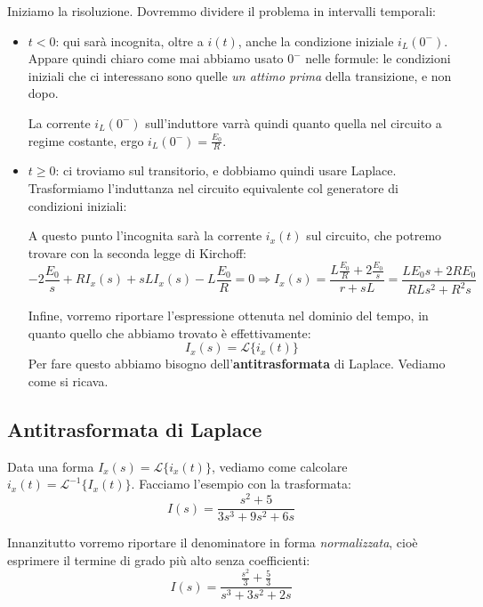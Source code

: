 \documentclass[a4paper,11pt]{article}
\begin{document}
Iniziamo la risoluzione.
Dovremmo dividere il problema in intervalli temporali:
\begin{itemize}
	\item $t < 0$: qui sarà incognita, oltre a $i(t)$, anche la condizione iniziale $i_L(0^-)$.
		Appare quindi chiaro come mai abbiamo usato $0^-$ nelle formule: le condizioni iniziali che ci interessano sono quelle \textit{un attimo prima} della transizione, e non dopo.

		La corrente $i_L(0^-)$ sull'induttore varrà quindi quanto quella nel circuito a regime costante, ergo $i_L(0^-) = \frac{E_0}{R}$.
	\item $t \geq 0$: ci troviamo sul transitorio, e dobbiamo quindi usare Laplace.
		Trasformiamo l'induttanza nel circuito equivalente col generatore di condizioni iniziali:

\begin{center}
\end{center}

A questo punto l'incognita sarà la corrente $i_x(t)$ sul circuito, che potremo trovare con la seconda legge di Kirchoff:
$$
-2 \frac{E_0}{s} + R I_x(s) + s L I_x(s) - L \frac{E_0}{R} = 0 \Rightarrow I_x(s) =  \frac{L \frac{E_0}{R} + 2 \frac{E_0}{s}}{r + s L} = \frac{L E_0 s + 2 R E_0}{R L s^2 + R^2 s}
$$

Infine, vorremo riportare l'espressione ottenuta nel dominio del tempo, in quanto quello che abbiamo trovato è effettivamente:
$$I_x(s) = \mathcal{L}\{ i_x(t) \}$$
Per fare questo abbiamo bisogno dell'\textbf{antitrasformata} di Laplace.
Vediamo come si ricava.
\end{itemize}

\subsection{Antitrasformata di Laplace}
Data una forma $I_x(s) = \mathcal{L}\{ i_x(t) \}$, vediamo come calcolare $ i_x(t) = \mathcal{L}^{-1} \{ I_x(t) \}$.
Facciamo l'esempio con la trasformata:
$$
I(s) = \frac{s^2 + 5}{3s^3 + 9s^2 + 6s}
$$

Innanzitutto vorremo riportare il denominatore in forma \textit{normalizzata}, cioè esprimere il termine di grado più alto senza coefficienti:
$$
I(s) = \frac{\frac{s^2}{3} + \frac{5}{3}}{s^3 + 3s^2 + 2s}
$$
\end{document}

